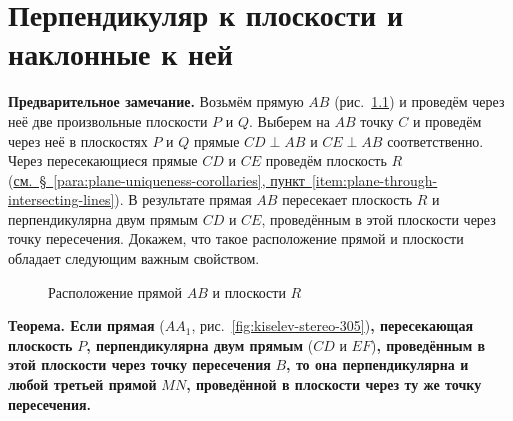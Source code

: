 \chapter{Перпендикуляр к плоскости и наклонные к ней}\label{ch:ch2}

\begingroup
\setlength{\intextsep}{10pt plus 2pt minus 2pt}
\setlength{\textfloatsep}{12pt plus 2pt minus 2pt}

\newcommand*{\kiselevPlanimetryPage}[2]{%
    \href{https://commons.wikimedia.org/wiki/File:\%D0\%90._\%D0\%9F._\%D0\%9A\%D0\%B8\%D1\%81\%D0\%B5\%D0\%BB\%D1\%91\%D0\%B2._\%D0\%AD\%D0\%BB\%D0\%B5\%D0\%BC\%D0\%B5\%D0\%BD\%D1\%82\%D0\%B0\%D1\%80\%D0\%BD\%D0\%B0\%D1\%8F_\%D0\%B3\%D0\%B5\%D0\%BE\%D0\%BC\%D0\%B5\%D1\%82\%D1\%80\%D0\%B8\%D1\%8F_(1914).djvu?page=#1}{#2}%
}

 \textbf{Предварительное замечание.} Возьмём прямую \(AB\) (рис.~\ref{fig:kiselev-stereo-304}) и проведём через неё две произвольные плоскости \(P\) и \(Q\). Выберем на \(AB\) точку \(C\) и проведём через неё в плоскостях \(P\) и \(Q\) прямые \(CD\perp AB\) и \(CE\perp AB\) соответственно. Через пересекающиеся прямые \(CD\) и \(CE\) проведём плоскость \(R\) (\hyperref[item:plane-through-intersecting-lines]{см.~§~\ref*{para:plane-uniqueness-corollaries}, пункт~\ref*{item:plane-through-intersecting-lines}}). В результате прямая \(AB\) пересекает плоскость \(R\) и перпендикулярна двум прямым \(CD\) и \(CE\), проведённым в этой плоскости через точку пересечения. Докажем, что такое расположение прямой и плоскости обладает следующим важным свойством.

\begin{figure}[htbp]
    \centering
    \renewcommand{\thefigure}{304}
    \captionsetup{name=Рис.,labelsep=period}
    
    \caption{Расположение прямой \(AB\) и плоскости \(R\)}\label{fig:kiselev-stereo-304}
\end{figure}

 \textbf{Теорема. Если прямая} (\(AA_1\), рис.~\ref{fig:kiselev-stereo-305})\textbf{, пересекающая плоскость} \(P\)\textbf{, перпендикулярна двум прямым} (\(CD\) и \(EF\))\textbf{, проведённым в этой плоскости через точку пересечения} \(B\)\textbf{, то она перпендикулярна и любой третьей прямой} \(MN\)\textbf{, проведённой в плоскости через ту же точку пересечения.}

